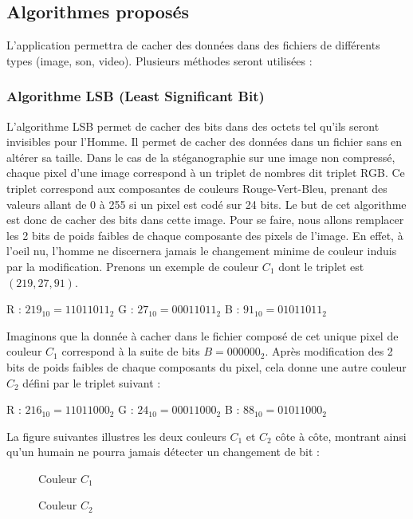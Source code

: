 \documentclass[11pt]{article}
\begin{document}
\subsection{Algorithmes proposés}

L'application permettra de cacher des données dans des fichiers de différents
types (image, son, video). Plusieurs méthodes seront utilisées : 

\subsubsection{Algorithme LSB (Least Significant Bit)}

L'algorithme LSB permet de cacher des bits dans des octets tel qu'ils seront
invisibles pour l'Homme. Il permet de cacher des données dans un fichier sans en
altérer sa taille. Dans le cas de la stéganographie sur une image non compressé,
chaque pixel d'une image correspond à un triplet de nombres dit triplet RGB. Ce
triplet correspond aux composantes de couleurs Rouge-Vert-Bleu, prenant des
valeurs allant de 0 à 255 si un pixel est codé sur 24 bits. Le but de cet
algorithme est donc de cacher des bits dans cette image. Pour se faire, nous
allons remplacer les 2 bits de poids faibles de chaque composante des pixels de
l'image. En effet, à l'oeil nu, l'homme ne discernera jamais le changement
minime de couleur induis par la modification.  Prenons un exemple de couleur
$C_1$ dont le triplet est $(219,27,91)$. 

R : $219_{10} = 11011011_2$ \qquad G : $27_{10} = 00011011_2$
\qquad B : $91_{10} = 01011011_2$

Imaginons que la donnée à cacher dans le fichier composé de cet unique pixel de
couleur $C_1$ correspond à la suite de bits $B = 000000_2$. Après modification
des 2 bits de poids faibles de chaque composants du pixel, cela donne une
autre couleur $C_2$ défini par le triplet suivant : 

R : $216_{10} = 11011000_2$ \qquad G : $24_{10} = 00011000_2$
\qquad B : $88_{10} = 01011000_2$

La figure suivantes illustres les deux couleurs $C_1$ et $C_2$ côte à côte,
montrant ainsi qu'un humain ne pourra jamais détecter un changement de bit : 

\begin{figure}[h]
 \begin{minipage}{.46\linewidth}
  \centering{}
  \caption{Couleur $C_1$}
 \end{minipage} \hfill
 \begin{minipage}{.46\linewidth}
  \centering{}
  \caption{Couleur $C_2$}
 \end{minipage}
\end{figure}
\end{document}
